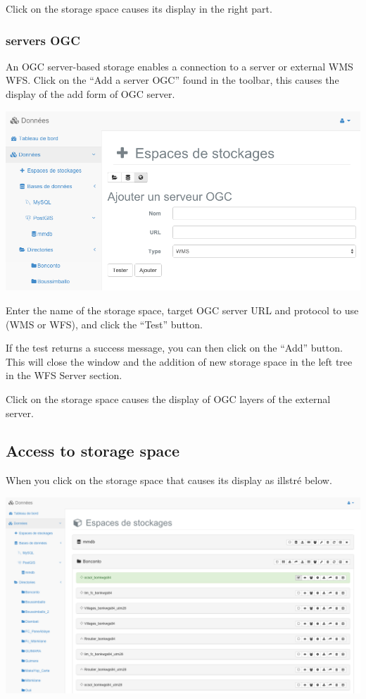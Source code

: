 \documentclass[letterpaper,10pt,english]{sphinxmanual}
\begin{document}
Click on the storage space causes its display in the right part.


\subsubsection{servers OGC}
\label{data/datastores:serveurs-ogc}
An OGC server-based storage enables a connection to a server or external WMS WFS. Click on the ``Add a server OGC'' found in the toolbar, this causes the display of the add form of OGC server.

\includegraphics[width=1.000\linewidth]{add-ogcserver-window.png}

Enter the name of the storage space, target OGC server URL and protocol to use (WMS or WFS), and click the ``Test'' button.

If the test returns a success message, you can then click on the ``Add'' button. This will close the window and the addition of new storage space in the left tree in the WFS Server section.

Click on the storage space causes the display of OGC layers of the external server.


\subsection{Access to storage space}
\label{data/datastores:acceder-a-un-espace-de-stockage}
When you click on the storage space that causes its display as illstré below.

\includegraphics[width=1.000\linewidth]{data-store-preview.png}
\end{document}
